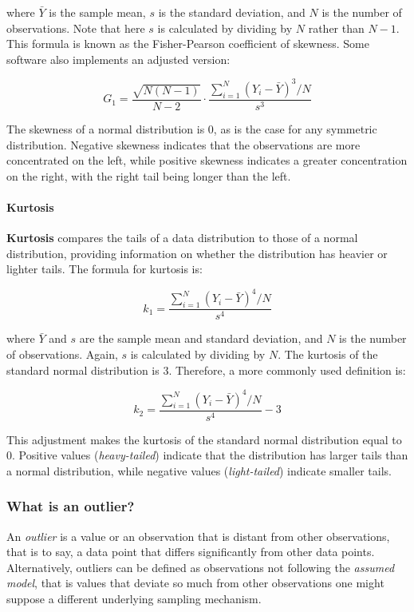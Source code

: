 \documentclass[
]{article}
\begin{document}
where \(\bar{Y}\) is the sample mean, \(s\) is the standard deviation,
and \(N\) is the number of observations. Note that here \(s\) is
calculated by dividing by \(N\) rather than \(N-1\). This formula is
known as the Fisher-Pearson coefficient of skewness. Some software also
implements an adjusted version:

\[
G_1 = \frac{\sqrt{N(N-1)}}{N-2} \cdot \frac{\sum_{i=1}^N (Y_i - \bar{Y})^3 / N}{s^3}
\]

The skewness of a normal distribution is 0, as is the case for any
symmetric distribution. Negative skewness indicates that the
observations are more concentrated on the left, while positive skewness
indicates a greater concentration on the right, with the right tail
being longer than the left.

\hypertarget{kurtosis}{%
\paragraph{Kurtosis}\label{kurtosis}}

\textbf{Kurtosis} compares the tails of a data distribution to those of
a normal distribution, providing information on whether the distribution
has heavier or lighter tails. The formula for kurtosis is:

\[
k_1 = \frac{\sum_{i=1}^N (Y_i - \bar{Y})^4 / N}{s^4}
\]

where \(\bar{Y}\) and \(s\) are the sample mean and standard deviation,
and \(N\) is the number of observations. Again, \(s\) is calculated by
dividing by \(N\). The kurtosis of the standard normal distribution is
3. Therefore, a more commonly used definition is:

\[
k_2 = \frac{\sum_{i=1}^N (Y_i - \bar{Y})^4 / N}{s^4} - 3
\]

This adjustment makes the kurtosis of the standard normal distribution
equal to 0. Positive values (\textit{heavy-tailed}) indicate that the
distribution has larger tails than a normal distribution, while negative
values (\textit{light-tailed}) indicate smaller tails.

\hypertarget{what-is-an-outlier}{%
\subsubsection{What is an outlier?}\label{what-is-an-outlier}}

An \emph{outlier} is a value or an observation that is distant from
other observations, that is to say, a data point that differs
significantly from other data points. Alternatively, outliers can be
defined as observations not following the \emph{assumed model}, that is
values that deviate so much from other observations one might suppose a
different underlying sampling mechanism.
\end{document}
